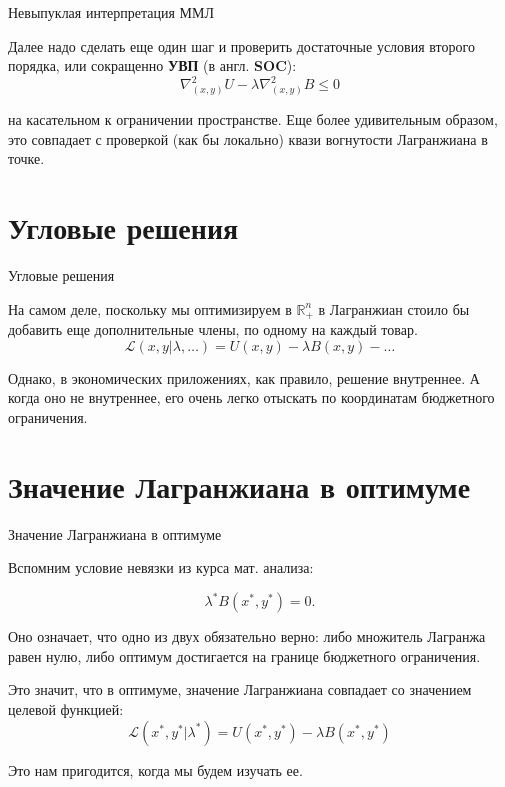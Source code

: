 \documentclass{beamer}
\begin{document}
\begin{frame}{Невыпуклая интерпретация ММЛ}

Далее надо сделать еще один шаг и проверить достаточные условия второго порядка, или сокращенно \textbf{УВП} (в англ. \textbf{SOC}):
$$ \nabla^2_{(x,y)}U - \lambda \nabla^2_{(x,y)} B \leqslant 0$$

на касательном к ограничении пространстве. Еще более удивительным образом, это совпадает с проверкой (как бы локально) квази вогнутости Лагранжиана в точке.

\end{frame}


\section{Угловые решения}

\begin{frame}{Угловые решения}

На самом деле, поскольку мы оптимизируем в $\mathbb{R}^n_{+}$ в Лагранжиан стоило бы добавить еще дополнительные члены, по одному на каждый товар. 
$$ \mathcal{L}(x,y | \lambda, \ldots) = U(x,y) - \lambda B(x,y) - \ldots$$

Однако, в экономических приложениях, как правило, решение внутреннее. А когда оно не внутреннее, его очень легко отыскать по координатам бюджетного ограничения.

\end{frame}

\section{Значение Лагранжиана в оптимуме}

\begin{frame}{Значение Лагранжиана в оптимуме}

Вспомним условие невязки из курса мат. анализа:

$$ \lambda^{\ast} B(x^{\ast},y^{\ast}) = 0.$$

Оно означает, что одно из двух обязательно верно: либо множитель Лагранжа равен нулю, либо оптимум достигается на границе бюджетного ограничения.

Это значит, что в оптимуме, значение Лагранжиана совпадает со значением целевой функцией:
$$ \mathcal{L}(x^{\ast}, y^{\ast} | \lambda^{\ast}) = U(x^{\ast}, y^{\ast}) - \lambda B(x^{\ast}, y^{\ast})$$ 

Это нам пригодится, когда мы будем изучать ее.

\end{frame}
\end{document}
